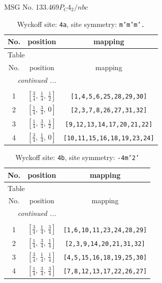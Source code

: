 \documentclass[fleqn,8pt]{jsarticle}
\begin{document}
\setcounter{MaxMatrixCols}{32}

\renewcommand{\tablename}{Table~}
\renewcommand{\figurename}{Figure~}
\begin{center}
\LARGE
MSG No. 133.469\quad$P_{C}4_{2}/nbc$
\end{center}
\renewcommand{\arraystretch}{1.2}
\begin{longtable}{ccc}
\caption{Wyckoff site: {\tt 4a}, site symmetry: {\tt m'm'm'.}}
 \\
 \hline \hline
No. & position & mapping \\ \hline \endfirsthead

\multicolumn{2}{l}{\tablename\ \thetable{}} \\
 \hline \hline
No. & position & mapping \\ \hline \endhead

 \hline \hline
\multicolumn{2}{r}{\footnotesize\it continued ...} \\ \endfoot

 \hline \hline
\multicolumn{2}{r}{} \\ \endlastfoot

1 & $\left[ \frac{3}{4},\, \frac{1}{4},\, \frac{1}{2} \right]$ & {\tt [1,4,5,6,25,28,29,30]} \\ \hline
2 & $\left[ \frac{1}{4},\, \frac{3}{4},\, 0 \right]$ & {\tt [2,3,7,8,26,27,31,32]} \\ \hline
3 & $\left[ \frac{1}{4},\, \frac{3}{4},\, \frac{1}{2} \right]$ & {\tt [9,12,13,14,17,20,21,22]} \\ \hline
4 & $\left[ \frac{3}{4},\, \frac{1}{4},\, 0 \right]$ & {\tt [10,11,15,16,18,19,23,24]} \\
\end{longtable}
\renewcommand{\arraystretch}{1.2}
\begin{longtable}{ccc}
\caption{Wyckoff site: {\tt 4b}, site symmetry: {\tt -4m'2'}}
 \\
 \hline \hline
No. & position & mapping \\ \hline \endfirsthead

\multicolumn{2}{l}{\tablename\ \thetable{}} \\
 \hline \hline
No. & position & mapping \\ \hline \endhead

 \hline \hline
\multicolumn{2}{r}{\footnotesize\it continued ...} \\ \endfoot

 \hline \hline
\multicolumn{2}{r}{} \\ \endlastfoot

1 & $\left[ \frac{3}{4},\, \frac{1}{4},\, \frac{3}{4} \right]$ & {\tt [1,6,10,11,23,24,28,29]} \\ \hline
2 & $\left[ \frac{1}{4},\, \frac{3}{4},\, \frac{1}{4} \right]$ & {\tt [2,3,9,14,20,21,31,32]} \\ \hline
3 & $\left[ \frac{3}{4},\, \frac{1}{4},\, \frac{1}{4} \right]$ & {\tt [4,5,15,16,18,19,25,30]} \\ \hline
4 & $\left[ \frac{1}{4},\, \frac{3}{4},\, \frac{3}{4} \right]$ & {\tt [7,8,12,13,17,22,26,27]} \\
\end{longtable}
\end{document}
